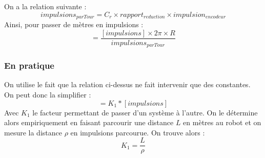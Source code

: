         On a la relation suivante :
        \begin{equation}
            impulsions_{parTour} = C_r \times rapport_{reduction} \times impulsion_{encodeur}
        \end{equation}
        Ainsi, pour passer de mètres en impulsions :
        \begin{equation}
            [m] = \frac{[impulsions] \times 2\pi \times R}{impulsions_{parTour}}
        \end{equation}

        \subsubsection{En pratique}
            On utilise le fait que la relation ci-dessus ne fait intervenir que des constantes.\\
            On peut donc la simplifier :
            \begin{equation}
                [m] = K_1 * [impulsions]
            \end{equation}
            Avec $K_1$ le facteur permettant de passer d’un système à l’autre. On le détermine alors empiriquement en faisant parcourir une distance $L$ en mètres au robot et on mesure la distance $\rho$ en impulsions parcourue. On trouve alors :
            \begin{equation}
                K_1 = \frac{L}{\rho}
            \end{equation}

    \newpage
